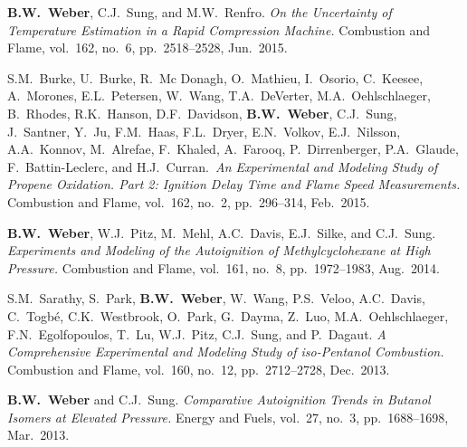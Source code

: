 \begin{bibmune}
\item \textbf{B.W.\ Weber}, C.J.\ Sung, and M.W.\ Renfro. \textit{On
        the Uncertainty of Temperature Estimation in a Rapid
        Compression Machine.} Combustion and Flame, vol.\ 162,
        no.\ 6, pp.\ 2518--2528, Jun.\ 2015.

\item S.M.\ Burke, U.\ Burke, R.\ Mc Donagh, O.\ Mathieu, I.\ Osorio,
        C.\ Keesee, A.\ Morones, E.L.\ Petersen, W.\ Wang, T.A.\ DeVerter,
        M.A.\ Oehlschlaeger, B.\ Rhodes, R.K.\ Hanson, D.F.\ Davidson,
        \textbf{B.W.\ Weber}, C.J.\ Sung, J.\ Santner, Y.\ Ju, F.M.\ Haas,
        F.L.\ Dryer, E.N.\ Volkov, E.J.\ Nilsson, A.A.\ Konnov, M.\ Alrefae,
        F.\ Khaled, A.\ Farooq, P.\ Dirrenberger, P.A.\ Glaude,
        F.\ Battin-Leclerc, and H.J.\ Curran.\ \textit{An Experimental and
        Modeling Study of Propene Oxidation. Part 2: Ignition Delay Time
        and Flame Speed Measurements.} Combustion and Flame, vol.\ 162, no.\ 2,
        pp.\ 296--314, Feb.\ 2015. \\ 

\item \textbf{B.W.\ Weber}, W.J.\ Pitz, M.\ Mehl, A.C.\ Davis,
        E.J.\ Silke, and C.J.\ Sung. \textit{Experiments and
        Modeling of the Autoignition of Methylcyclohexane at High
        Pressure.} Combustion and Flame, vol.\ 161, no.\ 8, pp.\
        1972--1983, Aug.\ 2014.

\item S.M.\ Sarathy, S.\ Park, \textbf{B.W.\ Weber}, W.\ Wang,
        P.S.\ Veloo, A.C.\ Davis, C.\ Togbé, C.K.\ Westbrook, O.\ Park,
        G.\ Dayma, Z.\ Luo, M.A.\ Oehlschlaeger, F.N.\ Egolfopoulos,
        T.\ Lu, W.J.\ Pitz, C.J.\ Sung, and P.\ Dagaut. \textit{A
        Comprehensive Experimental and Modeling Study of iso-Pentanol
        Combustion.} Combustion and Flame, vol.\ 160, no.\ 12, pp.\
        2712--2728, Dec.\ 2013. 

\item \textbf{B.W.\ Weber} and C.J.\ Sung. \textit{Comparative
        Autoignition Trends in Butanol Isomers at Elevated Pressure.}
        Energy and Fuels, vol.\ 27, no.\ 3, pp.\ 1688--1698, Mar.\ 2013. \\
        \doi{10.1021/ef302195c}


\end{bibmune}
